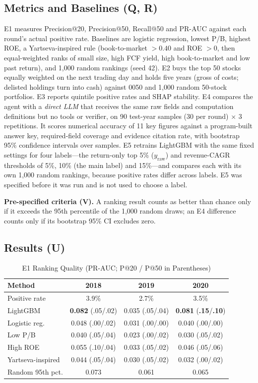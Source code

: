 \documentclass[conference]{IEEEtran}
\begin{document}
\subsection{Metrics and Baselines (Q, R)}
E1 measures Precision@20, Precision@50, Recall@50 and PR-AUC against each round's actual positive rate. Baselines are logistic regression, lowest P/B, highest ROE, a Yartseva-inspired rule (book-to-market $>0.40$ and ROE $>0$, then equal-weighted ranks of small size, high FCF yield, high book-to-market and low past return), and 1,000 random rankings (seed 42). E2 buys the top 50 stocks equally weighted on the next trading day and holds five years (gross of costs; delisted holdings turn into cash) against 0050 and 1,000 random 50-stock portfolios. E3 reports quintile positive rates and SHAP stability. E4 compares the agent with a \emph{direct LLM} that receives the same raw fields and computation definitions but no tools or verifier, on 90 test-year samples (30 per round) $\times$ 3 repetitions. It scores numerical accuracy of 11 key figures against a program-built answer key, required-field coverage and evidence citation rate, with bootstrap 95\% confidence intervals over samples. E5 retrains LightGBM with the same fixed settings for four labels---the return-only top 5\% ($y_{\text{raw}}$) and revenue-CAGR thresholds of 5\%, 10\% (the main label) and 15\%---and compares each with its own 1,000 random rankings, because positive rates differ across labels. E5 was specified before it was run and is not used to choose a label.

\textbf{Pre-specified criteria (V).} A ranking result counts as better than chance only if it exceeds the 95th percentile of the 1,000 random draws; an E4 difference counts only if its bootstrap 95\% CI excludes zero.

\subsection{Results (U)}

\begin{table}[t]
\centering
\caption{E1 Ranking Quality (PR-AUC; P@20 / P@50 in Parentheses)}
\label{tab:e1}
\small
\begin{tabular}{@{}lccc@{}}
\toprule
Method & 2018 & 2019 & 2020 \\
\midrule
Positive rate & 3.9\% & 2.7\% & 3.5\% \\
LightGBM & \textbf{0.082} (.05/.02) & 0.035 (.05/.04) & \textbf{0.081} (\textbf{.15}/\textbf{.10}) \\
Logistic reg. & 0.048 (.00/.02) & 0.031 (.00/.00) & 0.040 (.00/.00) \\
Low P/B & 0.040 (.05/.04) & 0.023 (.00/.02) & 0.030 (.05/.02) \\
High ROE & 0.055 (.10/.04) & 0.033 (.05/.02) & 0.046 (.05/.06) \\
Yartseva-inspired & 0.044 (.05/.04) & 0.030 (.05/.02) & 0.032 (.00/.02) \\
Random 95th pct. & 0.073 & 0.061 & 0.065 \\
\bottomrule
\end{tabular}
\end{table}
\end{document}
